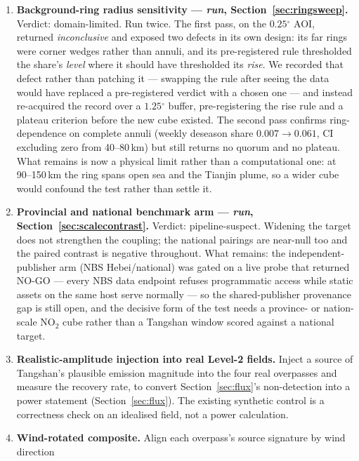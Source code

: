 \documentclass[11pt,a4paper]{article}
\providecommand{\degree}{\ensuremath{^{\circ}}}
\providecommand{\ce}[1]{\ensuremath{\mathrm{#1}}}
\begin{document}
\begin{enumerate}[leftmargin=1.6em,itemsep=0.3em,label=\textbf{C\arabic*.}]
  \item \textbf{Background-ring radius sensitivity --- \emph{run}, Section~\ref{sec:ringsweep}.}
  Verdict: domain-limited. Run twice. The first pass, on the $0.25\degree$ AOI, returned
  \emph{inconclusive} and exposed two defects in its own design: its far rings were corner wedges
  rather than annuli, and its pre-registered rule thresholded the share's \emph{level} where it
  should have thresholded its \emph{rise}. We recorded that defect rather than patching it --- swapping
  the rule after seeing the data would have replaced a pre-registered verdict with a chosen one ---
  and instead re-acquired the record over a $1.25\degree$ buffer, pre-registering the rise rule and a
  plateau criterion before the new cube existed. The second pass confirms ring-dependence on complete
  annuli (weekly deseason share $0.007\to0.061$, CI excluding zero from 40--80\,km) but still returns
  no quorum and no plateau. What remains is now a physical limit rather than a computational one: at
  90--150\,km the ring spans open sea and the Tianjin plume, so a wider cube would confound the test
  rather than settle it.
  \item \textbf{Provincial and national benchmark arm --- \emph{run}, Section~\ref{sec:scalecontrast}.}
  Verdict: pipeline-suspect. Widening the target does not strengthen the coupling; the national
  pairings are near-null too and the paired contrast is negative throughout. What remains: the
  independent-publisher arm (NBS Hebei/national) was gated on a live probe that returned NO-GO --- every
  NBS data endpoint refuses programmatic access while static assets on the same host serve normally
  --- so the shared-publisher provenance gap is still open, and the decisive form of the test needs a
  province- or nation-scale \ce{NO_2} cube rather than a Tangshan window scored against a national
  target.
  \item \textbf{Realistic-amplitude injection into real Level-2 fields.} Inject a source of
  Tangshan's plausible emission magnitude into the four real overpasses and measure the recovery
  rate, to convert Section~\ref{sec:flux}'s non-detection into a power statement
  (Section~\ref{sec:flux}). The existing synthetic control is a correctness check on an idealised
  field, not a power calculation.
  \item \textbf{Wind-rotated composite.} Align each overpass's source signature by wind direction

\end{enumerate}
\end{document}
